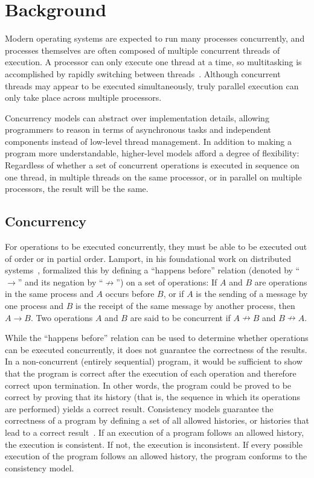 \documentclass{sig-alternate}
\begin{document}
\section{Background}

Modern operating systems are expected to run many processes concurrently, and processes themselves are often composed of multiple concurrent threads of execution. A processor can only execute one thread at a time, so multitasking is accomplished by rapidly switching between threads~\cite{Liu1973}. Although concurrent threads may appear to be executed simultaneously, truly parallel execution can only take place across multiple processors.

Concurrency models can abstract over implementation details, allowing programmers to reason in terms of asynchron\-ous tasks and independent components instead of low-level thread management. In addition to making a program more understandable, higher-level models afford a degree of flexibility: Regardless of whether a set of concurrent operations is executed in sequence on one thread, in multiple threads on the same processor, or in parallel on multiple processors, the result will be the same.

\subsection{Concurrency}

For operations to be executed concurrently, they must be able to be executed out of order or in partial order. Lamport, in his foundational work on distributed systems~\cite{Lamport1978}, formalized this by defining a ``happens before'' relation (denoted by ``$\rightarrow$'' and its negation by ``$\nrightarrow$'') on a set of operations: If $A$ and $B$ are operations in the same process and $A$ occurs before $B$, or if $A$ is the sending of a message by one process and $B$ is the receipt of the same message by another process, then $A \rightarrow B$. Two operations $A$ and $B$ are said to be concurrent if $A \nrightarrow B$ and $B \nrightarrow A$.

While the ``happens before'' relation can be used to determine whether operations can be executed concurrently, it does not guarantee the correctness of the results. In a non-concurrent (entirely sequential) program, it would be sufficient to show that the program is correct after the execution of each operation and therefore correct upon termination. In other words, the program could be proved to be correct by proving that its history (that is, the sequence in which its operations are performed) yields a correct result. Consistency models guarantee the correctness of a program by defining a set of all allowed histories, or histories that lead to a correct result~\cite{Ziv2015}. If an execution of a program follows an allowed history, the execution is consistent. If not, the execution is inconsistent. If every possible execution of the program follows an allowed history, the program conforms to the consistency model.
\end{document}
